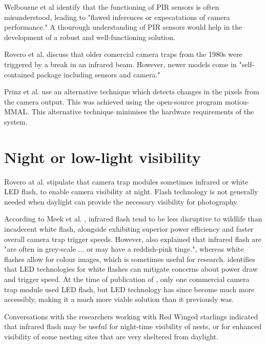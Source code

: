 \documentclass[class=report,11pt,crop=false]{standalone}
\begin{document}
Welbourne et al \cite{welbourne2016how} identify that the functioning of PIR sensors is often misunderstood, leading to "flawed inferences or expecatations of camera performance." A thourough understanding of PIR sensors would help in the development of a robust and well-functioning solution.

Rovero et al. \cite{rovero2013which} discuss that older comercial camera traps from the 1980s were triggered by a break in an infrared beam. However, newer models come in "self-contained package including sensors and camera." %

Prinz et al. \cite{prinz2016a} use an alternative technique which detects changes in the pixels from the camera output. This was achieved using the open-source program motion-MMAL. This alternative technique minimises the hardware requirements of the system.

\section{Night or low-light visibility}

Rovero at al. \cite{rovero2013which} stipulate that camera trap modules sometimes infrared or white LED flash, to enable camera visibility at night. Flash technology is not generally needed when daylight can provide the necessary visibility for photography.

According to Meek et al. \cite{meek2012introduction}, infrared flash tend to be less disruptive to wildlife than incadecent white flash, alongside exhibiting superior power efficiency and faster overall camera trap trigger speeds. However, \cite{meek2012introduction} also explained that infrared flash are "are often in grey-scale ... or may have a
reddish-pink tinge.", whereas white flashes allow for colour images, which is sometimes useful for research. \cite{meek2012introduction} identifies that LED technologies for white flashes can mitigate concerns about power draw and trigger speed. At the time of publication of \cite{meek2012introduction}, only one commercial camera trap module used LED flash, but LED technology has since become much more accessibly, making it a much more viable solution than it previously was.

Conversations with the researchers working with Red Winged starlings \cite{hofmeyer2024private} indicated that infrared flash may be useful for night-time visibility of nests, or for enhanced visibility of some nesting sites that are very sheltered from daylight.
\end{document}
